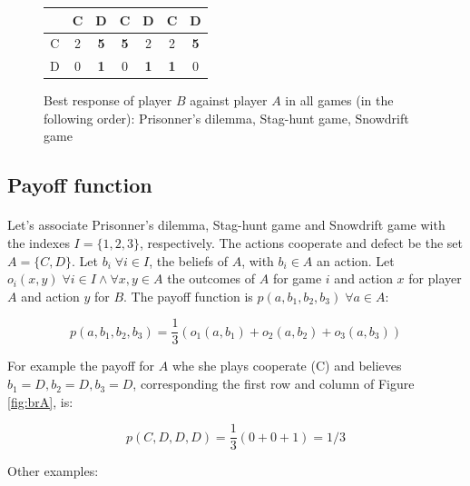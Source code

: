 \documentclass[letterpaper]{article}
\begin{document}
\begin{figure}[!ht]

\begin{center}
\begin{tabular}{|c|c|c||c|c||c|c|}
    \hline
    & C & D & C & D & C & D \\
    \hline
    C & 2 & \textbf{5} & \textbf{5}
    & 2 & 2 & \textbf{5} \\
    \hline
    D & 0 & \textbf{1} & 0 & \textbf{1}
    & \textbf{1} & 0 \\
    \hline
\end{tabular}
\end{center}

\caption{Best response of player $B$ against player $A$ in all games
 (in the following order): Prisonner's dilemma, Stag-hunt game, Snowdrift game}
\label{fig:brB}
\end{figure}


\subsection{Payoff function}

\paragraph{}

Let's associate Prisonner's dilemma, Stag-hunt game and Snowdrift game with
the indexes $I = \{1, 2, 3\}$, respectively. The actions
cooperate and defect be the set $A = \{C, D\}$. Let $b_i \; \forall i \in I$,
the beliefs of $A$, with $b_i \in A$ an action.
Let $o_i(x, y) \; \forall i \in I \wedge
\forall x,y \in A$ the outcomes of $A$ for game $i$ and action $x$ for
player $A$ and action $y$ for $B$. The
payoff function is $p(a, b_1, b_2, b_3) \; \forall a \in A$:

\begin{equation}
 p(a, b_1, b_2, b_3) = \frac{1}{3}(o_1(a, b_1)+o_2(a, b_2)+o_3(a, b_3))
\end{equation}

For example the payoff for $A$ whe she plays cooperate (C) and believes
$b_1 = D, b_2 = D, b_3 = D$,
corresponding the first row and column of Figure \ref{fig:brA},
is:

\begin{equation}
    p(C, D, D, D) = \frac{1}{3}(0 + 0 + 1) = 1/3
\end{equation}

Other examples:
\end{document}

